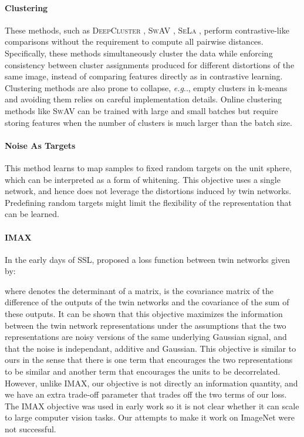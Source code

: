 \documentclass{article}
\makeatletter
\DeclareRobustCommand\onedot{\futurelet\@let@token\@onedot}
\def\@onedot{\ifx\@let@token.\else.\null\fi\xspace}
\def\eg{\emph{e.g}\onedot} \def\Eg{\emph{E.g}\onedot}
\makeatother
\begin{document}
\paragraph{Clustering}
These methods, such as \textsc{DeepCluster} \cite{caron2018deep}, \textsc{SwAV} \cite{caron2020swav}, \textsc{SeLa} \cite{asano2019self}, perform contrastive-like comparisons without the requirement to compute all pairwise distances. Specifically, these methods simultaneously cluster the data while enforcing consistency between cluster assignments produced for different distortions of the same image, instead of comparing features directly as in contrastive learning. Clustering methods are also prone to collapse, \eg, empty clusters in k-means and avoiding them relies on careful implementation details. Online clustering methods like \textsc{SwAV} can be trained with large and small batches but require storing features when the number of clusters is much larger than the batch size.



\paragraph{Noise As Targets} This method \cite{bojanowski2017unsupervised} learns to map samples to fixed random targets on the unit sphere, which can be interpreted as a form of whitening. This objective uses a single network, and hence does not leverage the distortions induced by twin networks. Predefining random targets might limit the flexibility of the representation that can be learned.




\paragraph{IMAX}

In the early days of SSL, \cite{becker_self-organizing_1992,zemel_discovering_1990} proposed a loss function between twin networks given by:

where  denotes the determinant of a matrix,  is the covariance matrix of the difference of the outputs of the twin networks and   the covariance of the sum of these outputs. It can be shown that this objective maximizes the information between the twin network representations under the assumptions that the two representations are noisy versions of the same underlying Gaussian signal, and that the noise is independant, additive and Gaussian. This objective is similar to ours in the sense that there is one term that encourages the two representations to be similar and another term that encourages the units to be decorrelated. However, unlike \textsc{IMAX}, our objective is not directly an information quantity, and we have an extra trade-off parameter  that trades off the two terms of our loss. The \textsc{IMAX} objective was used in early work so it is not clear whether it can scale to large computer vision tasks. Our attempts to make it work on ImageNet were not successful.
\end{document}

